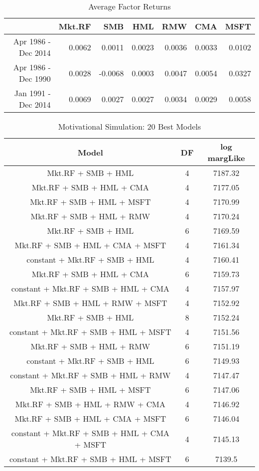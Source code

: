 \begin{table}[ht]
	\centering
	\begin{tabular}{rrrrrrr}
		\hline
		& Mkt.RF & SMB & HML & RMW & CMA & MSFT \\ 
		\hline
		 Apr 1986 - Dec 2014 & 0.0062 & 0.0011 & 0.0023 & 0.0036 & 0.0033 & 0.0102 \\ 
		Apr 1986 - Dec 1990 & 0.0028 & -0.0068 & 0.0003 & 0.0047 & 0.0054 & 0.0327 \\ 
		Jan 1991 - Dec 2014 & 0.0069 & 0.0027 & 0.0027 & 0.0034 & 0.0029 & 0.0058 \\ 
		\hline
	\end{tabular}
		\caption{Average Factor Returns}
\end{table}
\begin{table}[ht]
	
	\centering
	\begin{tabular}{ccc}
		\hline
		Model & DF & log margLike \\ 
		\hline
Mkt.RF + SMB + HML & 4 & 7187.32 \\ 
Mkt.RF + SMB + HML + CMA & 4 & 7177.05 \\ 
Mkt.RF + SMB + HML + MSFT & 4 & 7170.99 \\ 
Mkt.RF + SMB + HML + RMW & 4 & 7170.24 \\ 
Mkt.RF + SMB + HML & 6 & 7169.59 \\ 
Mkt.RF + SMB + HML + CMA + MSFT & 4 & 7161.34 \\ 
constant + Mkt.RF + SMB + HML & 4 & 7160.41 \\ 
Mkt.RF + SMB + HML + CMA & 6 & 7159.73 \\ 
constant + Mkt.RF + SMB + HML + CMA & 4 & 7157.97 \\ 
Mkt.RF + SMB + HML + RMW + MSFT & 4 & 7152.92 \\ 
Mkt.RF + SMB + HML & 8 & 7152.24 \\ 
constant + Mkt.RF + SMB + HML + MSFT & 4 & 7151.56 \\ 
Mkt.RF + SMB + HML + RMW & 6 & 7151.19 \\ 
constant + Mkt.RF + SMB + HML & 6 & 7149.93 \\ 
constant + Mkt.RF + SMB + HML + RMW & 4 & 7147.47 \\ 
Mkt.RF + SMB + HML + MSFT & 6 & 7147.06 \\ 
Mkt.RF + SMB + HML + RMW + CMA & 4 & 7146.92 \\ 
Mkt.RF + SMB + HML + CMA + MSFT & 6 & 7146.04 \\ 
constant + Mkt.RF + SMB + HML + CMA + MSFT & 4 & 7145.13 \\ 
constant + Mkt.RF + SMB + HML + MSFT & 6 & 7139.5 \\ 
		\hline
	\end{tabular}
	\caption{Motivational Simulation: 20 Best Models}
\end{table}

